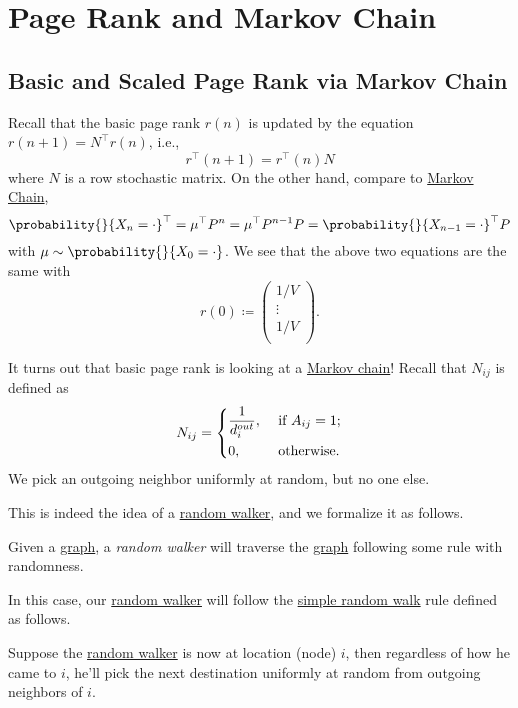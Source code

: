 \chapter{Page Rank and Markov Chain}
\section{Basic and Scaled Page Rank via Markov Chain}
Recall that the basic page rank \(r(n)\) is updated by the equation \(r(n+1) = N^{\top}r(n)\), i.e.,
\[
	r^{\top}(n+1) = r^{\top}(n)N
\]
where \(N\) is a row stochastic matrix. On the other hand, compare to \hyperref[def:Markov-chain]{Markov Chain},
\[
	\probability{}{X_n = \cdot}^{\top} = \mu^{\top}P^n = \mu^{\top}P^{n-1}P = \probability{}{X_{n-1} = \cdot}^{\top}P
\]
with \(\mu\sim \probability{}{X_0 = \cdot}\). We see that the above two equations are the same with
\[
	r(0)\coloneqq \begin{pmatrix}
		1/V    \\
		\vdots \\
		1/V    \\
	\end{pmatrix}.
\]

\begin{remark}
	It turns out that basic page rank is looking at a \hyperref[def:Markov-chain]{Markov chain}! Recall that \(N_{ij}\) is defined as
	\[
		N_{ij} = \begin{dcases}
			\frac{1}{d_i^{out}}, & \text{ if }A_{ij}= 1; \\
			0,                   & \text{ otherwise}.
		\end{dcases}
	\]
	We pick an outgoing neighbor uniformly at random, but no one else.
\end{remark}

This is indeed the idea of a \hyperref[def:random-walker]{random walker}, and we formalize it as follows.
\begin{definition}\label{def:random-walker}
	Given a \hyperref[def:graph]{graph}, a \emph{random walker} will traverse the \hyperref[def:graph]{graph} following some rule
	with randomness.
\end{definition}

In this case, our \hyperref[def:random-walker]{random walker} will follow the \hyperref[def:simple-random-walk]{simple random walk} rule
defined as follows.
\begin{definition}\label{def:simple-random-walk}
	Suppose the \hyperref[def:random-walker]{random walker} is now at location (node) \(i\), then regardless of how he came to \(i\),
	he'll pick the next destination uniformly at random from outgoing neighbors of \(i\).
	\begin{figure}[H]
		\centering
		\label{fig:random-walker}
	\end{figure}
\end{definition}

